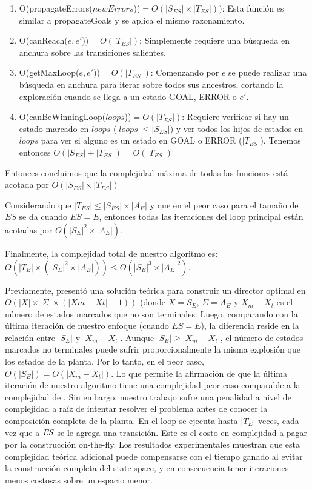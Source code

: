 \begin{enumerate}
	\item O(propagateErrors($newErrors$))$ = O(|S_{ES}| \times |T_{ES}|))$: Esta función es similar a propagateGoals y se aplica el mismo razonamiento.	
	
	\item O(canReach($e, e'$))$ = O(|T_{ES}|)$: Simplemente requiere una búsqueda en anchura sobre las transiciones salientes.
	
	\item O(getMaxLoop($e, e'$))$ = O(|T_{ES}|)$: 
	Comenzando por $e$ se puede realizar una búsqueda en anchura para iterar sobre todos sus ancestros, cortando la exploración cuando se llega a un estado GOAL, ERROR o $e'$. 
	
	
	\item O(canBeWinningLoop($loops$))$ = O(|T_{ES}|)$: Requiere verificar si hay un estado marcado en $loops$ ($|loops| \leq |S_{ES}|$) y ver todos los hijos de estados en $loops$ para ver si alguno es un estado en GOAL o ERROR ($|T_{ES}|$).  
	Tenemos entonces $O(|S_{ES}| + |T_{ES}|) = O(|T_{ES}|)$
	
\end{enumerate}

Entonces concluimos que la complejidad máxima de todas las funciones está acotada por $O(|S_{ES}| \times |T_{ES}|)$  

Considerando que $|T_{ES}| \leq|S_{ES}|\times|A_E|$ y que en el peor caso para el tamaño de $ES$ se da cuando $ES=E$, entonces todas las iteraciones del loop principal están acotadas por $O(|S_E|^2\times|A_E|)$.

Finalmente, la complejidad total de nuestro algoritmo es: $O(|T_E| \times (|S_E|^2 \times |A_E|)) \leq O(|S_E|^3 \times |A_E|^2)$.

Previamente, \cite{Huang:2007:Optimal}
presentó una solución teórica para construir un director optimal en $O(|X| \times |\Sigma| × (|X m − X t | + 1))$ (donde $X=S_E$, $\Sigma = A_E$ y $X_m - X_t$ es el número de 
estados marcados que no son terminales. 
Luego, comparando \cite{Huang:2007:Optimal} 
con la última iteración de nuestro enfoque (cuando $ES=E$), la diferencia reside en la relación entre
$|S_E|$ y $|X_m - X_t|$. 
Aunque $|S_E| \geq |X_m - X_t|$, el número de estados marcados no terminales puede sufrir proporcionalmente la misma explosión que los estados de la planta.
Por lo tanto, en el peor caso, $O(|S_E|) = O(|X_m - X_t|)$. Lo que permite la afirmación de que la última iteración de nuestro algoritmo tiene una complejidad peor caso comparable a la complejidad de 
\cite{Huang:2007:Optimal}.
Sin embargo, nuestro trabajo sufre una penalidad a nivel de complejidad a raíz de intentar resolver el problema antes de conocer la composición completa de la planta. En \DCS el loop se ejecuta hasta
|$T_E$| veces, cada vez que a $\mathit{ES}$ se le agrega una transición. Este es el costo en complejidad a pagar por la construcción on-the-fly. 
Los resultados experimentales muestran que esta complejidad teórica adicional puede compensarse con el tiempo ganado al evitar la construcción completa del state space, y en consecuencia tener iteraciones menos costosas sobre un espacio menor. 







